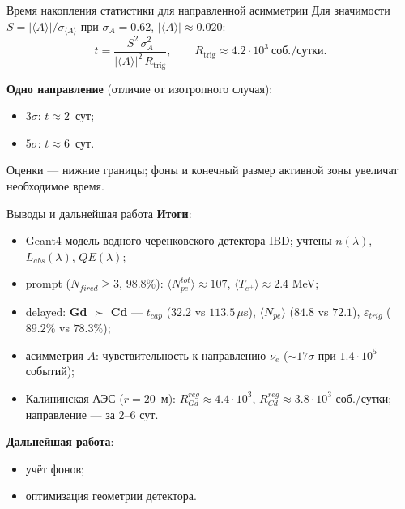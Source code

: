 \documentclass[aspectratio=169,12pt]{beamer}
\begin{document}
\begin{frame}{Время накопления статистики для направленной асимметрии}
\small
Для значимости $S=|\langle A\rangle|/\sigma_{\langle A\rangle}$ при $\sigma_A=0.62$, $|\langle A\rangle|\approx 0.020$:
\begin{equation}
    t=\frac{S^2\,\sigma_A^2}{|\langle A\rangle|^2\,R_{\mathrm{trig}}},\qquad
    R_{\mathrm{trig}}\approx 4.2\cdot 10^{3}~\text{соб./сутки}.
\end{equation}

\medskip
\textbf{Одно направление} (отличие от изотропного случая):
\begin{itemize}\setlength{\itemsep}{0pt}
    \item $3\sigma$: $t\approx 2$~сут;
    \item $5\sigma$: $t\approx 6$~сут.
\end{itemize}

\smallskip
Оценки --- нижние границы; фоны и конечный размер активной зоны увеличат необходимое время.
\end{frame}

\begin{frame}{Выводы и дальнейшая работа}
\small
\textbf{Итоги}:
\begin{itemize}\setlength{\itemsep}{0pt}
    \item Geant4-модель водного черенковского детектора IBD; учтены $n(\lambda)$, $L_{abs}(\lambda)$, $QE(\lambda)$;
    \item prompt ($N_{fired}\ge 3$, $98.8\%$): $\langle N^{tot}_{pe}\rangle\approx 107$, $\langle T_{e^+}\rangle\approx 2{.}4$ MeV;
    \item delayed: \textbf{Gd $\succ$ Cd} --- $t_{cap}$ ($32.2$ vs $113.5\,\mu$s), $\langle N_{pe}\rangle$ ($84.8$ vs $72.1$), $\varepsilon_{trig}$ ($89.2\%$ vs $78.3\%$);
    \item асимметрия $A$: чувствительность к направлению $\bar{\nu}_e$ ($\sim 17\sigma$ при $1.4\cdot 10^5$ событий);
    \item Калининская АЭС ($r=20$~м): $R^{reg}_{Gd}\approx 4.4\cdot 10^3$, $R^{reg}_{Cd}\approx 3.8\cdot 10^3$ соб./сутки; направление --- за $2$--$6$ сут.
\end{itemize}

\smallskip
\textbf{Дальнейшая работа}:
\begin{itemize}\setlength{\itemsep}{0pt}
    \item учёт фонов;
    \item оптимизация геометрии детектора.
\end{itemize}
\end{frame}
\end{document}
